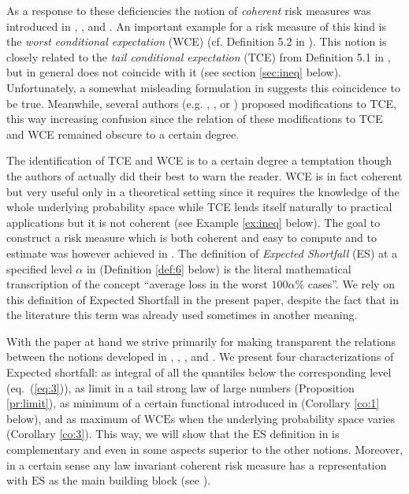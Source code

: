 \documentclass[11pt,a4paper,leqno]{article}
\begin{document}
As a response to these deficiencies the notion of \emph{coherent} risk measures was
introduced in \cite{ADEH97}, \cite{ADEH99}, and \cite{Delb98}. An important example for
a risk measure of this kind is the \emph{worst conditional expectation} (WCE) 
(cf. Definition
5.2 in \cite{ADEH99}). This notion is closely related to the \emph{tail conditional expectation} (TCE)
from Definition 5.1 in \cite{ADEH99}, but in general does not coincide with it (see section \ref{sec:ineq} below).
Unfortunately, 
a somewhat misleading formulation in \cite{ADEH97} suggests this coincidence to be true.
Meanwhile, several authors (e.g. \cite{Ur00}, \cite{Pf00}, or \cite{ANS}) proposed modifications to TCE, 
this way increasing confusion
since the relation of these modifications to TCE and WCE remained obscure to a
certain degree.

The identification of TCE and WCE is to a certain degree 
a temptation though the authors of \cite{ADEH99} actually did their best to warn the reader. 
WCE is in fact coherent but very useful only in a theoretical setting since it requires the knowledge of the whole 
underlying probability space
while TCE lends itself naturally to practical applications but it is not coherent (see Example \ref{ex:ineq} below).
The goal to construct a risk measure which is  both coherent and easy to
compute and to estimate   
was however achieved in \cite{ANS}. The definition of \emph{Expected Shortfall} (ES) at a specified level $\alpha$ in \cite{ANS} 
(Definition \ref{def:6} below)
is the literal mathematical transcription of the concept ``average loss in the worst $100 \alpha$\% cases''. 
We rely on this definition of Expected Shortfall in the present paper, despite the fact that 
in the literature this term was already used sometimes in another meaning.

With the paper at hand we strive primarily for  making transparent the relations between the
notions developed in \cite{Delb98}, \cite{ADEH99},  \cite{Pf00}, and \cite{ANS}.
We present four characterizations of Expected shortfall: as integral of all the quantiles
below the corresponding level (eq.~(\ref{eq:3})), as limit in a tail
strong law of large numbers (Proposition \ref{pr:limit}), as minimum of a
certain functional introduced in \cite{Pf00} (Corollary \ref{co:1} below), and
as
maximum of $\mathrm{WCE}$s when the underlying probability space varies
(Corollary \ref{co:3}).
This way, we will show that the $\mathrm{ES}$ definition in \cite{ANS} is complementary 
and even in some aspects superior to the other notions. Moreover, in a certain sense any
law invariant coherent risk measure has a representation with $\mathrm{ES}$ as the main
building block (see \cite{Kusuoka}).
\end{document}
